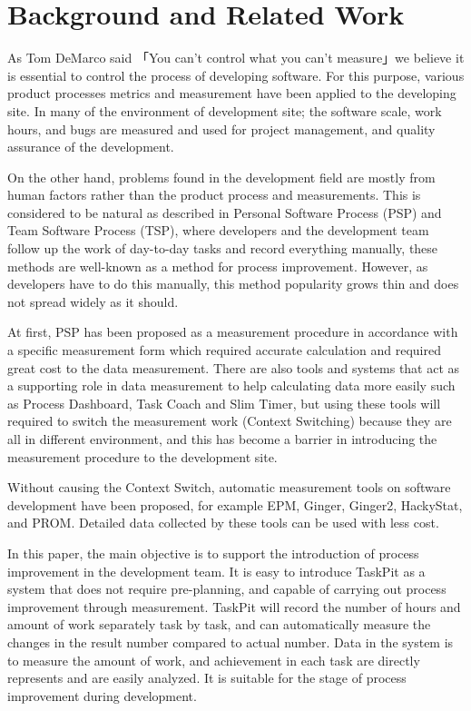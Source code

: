\documentclass [paper]{ieice}
\begin{document}
\section {Background and Related Work}
	
	As Tom DeMarco said 「You can't control what you can't measure」we believe it is essential to control the process of developing software\cite{demarco1986controlling}. For this purpose, various product processes metrics and measurement have been applied to the developing site\cite{grady1992practical}. In many of the environment of development site; the software scale, work hours, and bugs are measured and used for project management, and quality assurance of the development\cite{nec2010software}\cite{putnam2013five}. \par
	On the other hand, problems found in the development field are mostly from human factors\cite{sec2010itproject} rather than the product process and measurements. This is considered to be natural as described in Personal Software Process (PSP) and Team Software Process (TSP), where developers and the development team follow up the work of day-to-day tasks and record everything manually, these methods are well-known as a method for process improvement\cite{humphrey1995discipline}\cite{humphrey2001}. However, as developers have to do this manually, this method popularity grows thin and does not spread widely as it should. \par
	At first, PSP has been proposed as a measurement procedure in accordance with a specific measurement form which required accurate calculation and required great cost to the data measurement. There are also tools and systems that act as a supporting role in data measurement to help calculating data more easily such as Process Dashboard\cite{processdashboard}, Task Coach\cite{taskcoach} and Slim Timer\cite{slimtimer}, but using these tools will required to switch the measurement work (Context Switching) because they are all in different environment, and this has become a barrier in introducing the measurement procedure to the development site\cite{sillitti2003collecting}. \par
	Without causing the Context Switch, automatic measurement tools on software development have been proposed, for example EPM\cite{ohira2004empirical}, Ginger\cite{}, Ginger2\cite{torii1999ginger2}, HackyStat\cite{}, and PROM\cite{}. Detailed data collected by these tools can be used with less cost. \par
	In this paper, the main objective is to support the introduction of process improvement in the development team. It is easy to introduce TaskPit as a system that does not require pre-planning, and capable of carrying out process improvement through measurement. TaskPit will record the number of hours and amount of work separately task by task, and can automatically measure the changes in the result number compared to actual number. Data in the system is to measure the amount of work, and achievement in each task are directly represents and are easily analyzed. It is suitable for the stage of process improvement during development.
	
\end{document}
